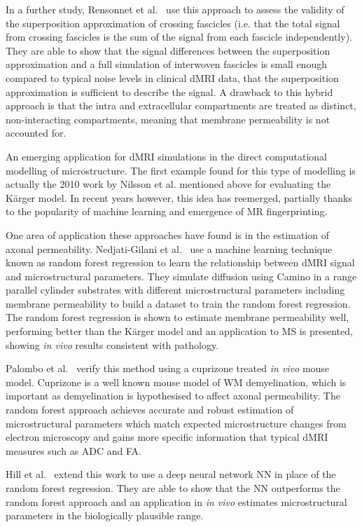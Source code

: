 In a further study, Rensonnet et al.\ \cite{Rensonnet2017} use this approach to assess the validity of the superposition approximation of crossing fascicles (i.e. that the total signal from crossing fascicles is the sum of the signal from each fascicle independently).
They are able to show that the signal differences between the superposition approximation and a full simulation of interwoven fascicles is small enough compared to typical noise levels in clinical \ac{dMRI} data, that the superposition approximation is sufficient to describe the signal.
A drawback to this hybrid approach is that the intra and extracellular compartments are treated as distinct, non-interacting compartments, meaning that membrane permeability is not accounted for.

An emerging application for \ac{dMRI} simulations in the direct computational modelling of microstructure.
The first example found for this type of modelling is actually the 2010 work by Nilsson et al. \cite{Nilsson2010} mentioned above for evaluating the K\"arger model.
In recent years however, this idea has reemerged, partially thanks to the popularity of machine learning and emergence of MR fingerprinting.

One area of application these approaches have found is in the estimation of axonal permeability. Nedjati-Gilani et al.\ \cite{Nedjati-Gilani2017} use a machine learning technique known as random forest regression to learn the relationship between \ac{dMRI} signal and microstructural parameters. They simulate diffusion using Camino in a range parallel cylinder substrates with different microstructural parameters including membrane permeability to build a dataset to train the random forest regression.
The random forest regression is shown to estimate membrane permeability well, performing better than the K\"arger model and an application to \ac{MS} is presented, showing \emph{in vivo} results consistent with pathology.

Palombo et al.\ \cite{Palombo2018a} verify this method using a cuprizone treated \emph{in vivo} mouse model. Cuprizone is a well known mouse model of \ac{WM} demyelination, which is important as demyelination is hypothesised to affect axonal permeability.
The random forest approach achieves accurate and robust estimation of microstructural parameters which match expected microstructure changes from electron microscopy and gains more specific information that typical \ac{dMRI} measures such as \ac{ADC} and \ac{FA}. 

Hill et al.\ \cite{Hill2018} extend this work to use a deep neural network \ac{NN} in place of the random forest regression. They are able to show that the \ac{NN} outperforms the random forest approach and an application in \emph{in vivo} estimates microstructural parameters in the biologically plausible range.

